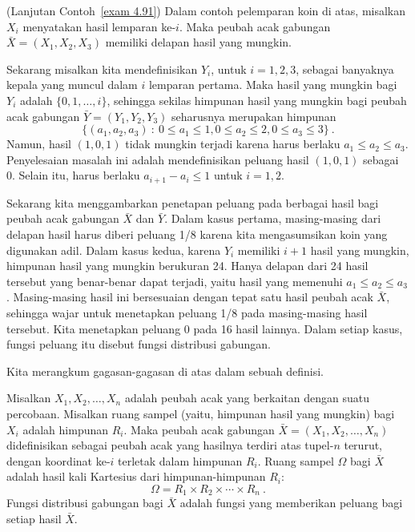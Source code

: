\begin{example}(Lanjutan Contoh~\ref{exam 4.91}){\label{exam 4.92}}
Dalam contoh pelemparan koin di atas, misalkan $X_i$ menyatakan hasil lemparan ke-$i$.  Maka
peubah acak gabungan ${\bar X} = (X_1, X_2, X_3)$ memiliki delapan hasil yang mungkin.
\par
Sekarang misalkan kita mendefinisikan $Y_i$, untuk $i = 1, 2, 3$, sebagai banyaknya kepala yang muncul dalam
$i$ lemparan pertama.  Maka hasil yang mungkin bagi $Y_i$ adalah $\{0, 1, \ldots, i\}$, sehingga sekilas
himpunan hasil yang mungkin bagi peubah acak gabungan ${\bar Y} = (Y_1,
Y_2, Y_3)$ seharusnya merupakan himpunan
$$\{(a_1, a_2, a_3)\ :\ 0 \le a_1 \le 1, 0 \le a_2 \le 2, 0 \le a_3 \le 3\}\ .$$
Namun, hasil $(1, 0, 1)$ tidak mungkin terjadi karena harus berlaku $a_1 \le a_2 \le a_3$.  Penyelesaian
masalah ini adalah mendefinisikan peluang hasil $(1, 0, 1)$ sebagai 0.  Selain itu, harus
berlaku $a_{i+1} - a_i \le 1$ untuk $i = 1, 2$.
\par
Sekarang kita menggambarkan penetapan peluang pada berbagai hasil bagi peubah acak gabungan
${\bar X}$ dan ${\bar Y}$.  Dalam kasus pertama, masing-masing dari
delapan hasil harus diberi peluang 1/8 karena kita mengasumsikan koin yang digunakan
adil.  Dalam kasus kedua, karena $Y_i$ memiliki $i+1$ hasil yang mungkin, himpunan hasil yang
mungkin berukuran 24.    Hanya delapan dari 24 hasil tersebut yang benar-benar dapat terjadi, yaitu hasil yang
memenuhi $a_1 \le a_2 \le a_3$.  Masing-masing hasil ini bersesuaian dengan tepat satu
hasil peubah acak ${\bar X}$, sehingga wajar untuk menetapkan peluang 1/8
pada masing-masing hasil tersebut.  Kita menetapkan peluang 0 pada 16 hasil lainnya.  Dalam setiap kasus,
fungsi peluang itu disebut fungsi distribusi gabungan.
\end{example}

Kita merangkum gagasan-gagasan di atas dalam sebuah definisi.

\begin{definition}\label{def 4.4}
Misalkan $X_1, X_2, \ldots, X_n$ adalah peubah acak yang berkaitan dengan suatu percobaan.  Misalkan
ruang sampel (yaitu, himpunan hasil yang mungkin) bagi $X_i$ adalah himpunan $R_i$.  Maka
peubah acak gabungan ${\bar
X} = (X_1, X_2,
\ldots, X_n)$ didefinisikan sebagai peubah acak yang hasilnya terdiri atas tupel-$n$ terurut,
dengan koordinat
ke-$i$ terletak dalam himpunan $R_i$.  Ruang sampel $\Omega$ bagi ${\bar X}$ adalah
hasil kali Kartesius dari himpunan-himpunan $R_i$:  
$$\Omega = R_1 \times R_2 \times \cdots \times R_n\ .$$
Fungsi distribusi gabungan bagi
${\bar X}$ adalah fungsi yang memberikan peluang bagi setiap hasil
${\bar X}$.
\end{definition}

